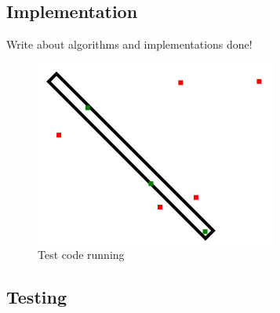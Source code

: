 \subsection{Implementation}

	Write about algorithms and implementations done!
	
	\begin{figure}[H]
		\includegraphics[scale=0.6]{pictures/touchInStroke.png}
		\caption{Test code running}
	\end{figure}

\subsection{Testing}


